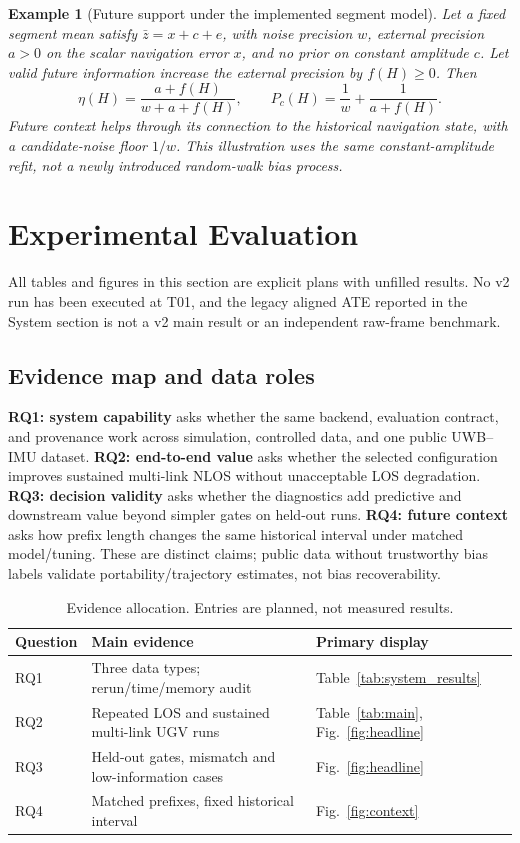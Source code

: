 \documentclass[conference]{IEEEtran}%
\newtheorem{example}{Example}
\begin{document}
\begin{example}[Future support under the implemented segment model]
Let a fixed segment mean satisfy $\bar z=x+c+e$, with noise precision $w$, external precision $a>0$ on the scalar navigation error $x$, and no prior on constant amplitude $c$. Let valid future information increase the external precision by $f(H)\geq0$. Then
\begin{equation}
 \eta(H)=\frac{a+f(H)}{w+a+f(H)},\qquad
 P_c(H)=\frac1w+\frac1{a+f(H)}.
 \label{eq:scalar_future}
\end{equation}
Future context helps through its connection to the historical navigation state, with a candidate-noise floor $1/w$. This illustration uses the same constant-amplitude refit, not a newly introduced random-walk bias process.
\end{example}

\section{Experimental Evaluation}
\label{sec:experiments}
All tables and figures in this section are explicit plans with unfilled results.
No v2 run has been executed at T01, and the legacy aligned ATE reported in the
System section is not a v2 main result or an independent raw-frame benchmark.
\subsection{Evidence map and data roles}
\textbf{RQ1: system capability} asks whether the same backend, evaluation contract, and provenance work across simulation, controlled data, and one public UWB--IMU dataset.
\textbf{RQ2: end-to-end value} asks whether the selected configuration improves sustained multi-link NLOS without unacceptable LOS degradation.
\textbf{RQ3: decision validity} asks whether the diagnostics add predictive and downstream value beyond simpler gates on held-out runs.
\textbf{RQ4: future context} asks how prefix length changes the same historical interval under matched model/tuning.
These are distinct claims; public data without trustworthy bias labels validate portability/trajectory estimates, not bias recoverability.

\begin{table}[t]
\centering\small
\caption{Evidence allocation. Entries are planned, not measured results.}
\label{tab:evidence}
\begin{tabularx}{\columnwidth}{@{}lXX@{}}
\toprule
Question & Main evidence & Primary display\\
\midrule
RQ1 & Three data types; rerun/time/memory audit & Table~\ref{tab:system_results}\\
RQ2 & Repeated LOS and sustained multi-link UGV runs & Table~\ref{tab:main}, Fig.~\ref{fig:headline}\\
RQ3 & Held-out gates, mismatch and low-information cases & Fig.~\ref{fig:headline}\\
RQ4 & Matched prefixes, fixed historical interval & Fig.~\ref{fig:context}\\
\bottomrule
\end{tabularx}
\end{table}
\end{document}
